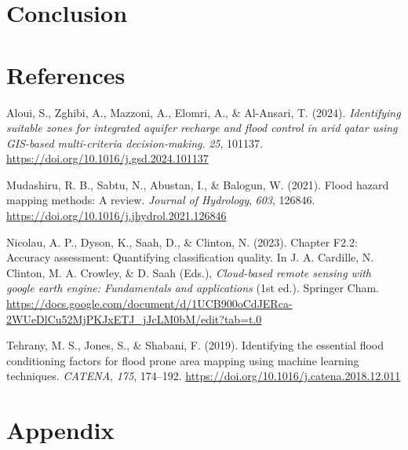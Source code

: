 \documentclass[
]{agujournal2019}
\newlength{\cslhangindent}
\newenvironment{CSLReferences}[2] %
 {\begin{list}{}{%
  \setlength{\itemindent}{0pt}
  \setlength{\leftmargin}{0pt}
  \setlength{\parsep}{0pt}
  \ifodd #1
   \setlength{\leftmargin}{\cslhangindent}
   \setlength{\itemindent}{-1\cslhangindent}
  \fi
  \setlength{\itemsep}{#2\baselineskip}}}
 {\end{list}}
\begin{document}
\section{Conclusion}\label{conclusion}

\section*{References}\label{references}

\label{refs}
\begin{CSLReferences}{1}{0}
\vspace{1em}

Aloui, S., Zghibi, A., Mazzoni, A., Elomri, A., \& Al-Ansari, T. (2024).
\emph{Identifying suitable zones for integrated aquifer recharge and
flood control in arid qatar using GIS-based multi-criteria
decision-making}. \emph{25}, 101137.
\url{https://doi.org/10.1016/j.gsd.2024.101137}

Mudashiru, R. B., Sabtu, N., Abustan, I., \& Balogun, W. (2021). Flood
hazard mapping methods: A review. \emph{Journal of Hydrology},
\emph{603}, 126846. \url{https://doi.org/10.1016/j.jhydrol.2021.126846}

Nicolau, A. P., Dyson, K., Saah, D., \& Clinton, N. (2023). Chapter
F2.2: Accuracy assessment: Quantifying classification quality. In J. A.
Cardille, N. Clinton, M. A. Crowley, \& D. Saah (Eds.),
\emph{Cloud-based remote sensing with google earth engine: Fundamentals
and applications} (1st ed.). Springer Cham.
\url{https://docs.google.com/document/d/1UCB900oCdJERca-2WUeDlCu52MjPKJxETJ_jJcLM0bM/edit?tab=t.0}

Tehrany, M. S., Jones, S., \& Shabani, F. (2019). Identifying the
essential flood conditioning factors for flood prone area mapping using
machine learning techniques. \emph{CATENA}, \emph{175}, 174--192.
\url{https://doi.org/10.1016/j.catena.2018.12.011}

\end{CSLReferences}

\section{Appendix}\label{appendix}
\end{document}
